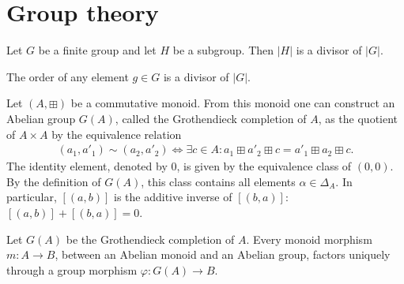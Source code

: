 \section{Group theory}\label{section:groups}



    \begin{theorem}[Lagrange]
        Let $G$ be a finite group and let $H$ be a subgroup. Then $|H|$ is a divisor of $|G|$.
    \end{theorem}
    \begin{result}
        The order of any element $g\in G$ is a divisor of $|G|$.
    \end{result}

    \begin{construct}\label{group:grothendieck_completion}
        Let $(A,\boxplus)$ be a commutative monoid. From this monoid one can construct an Abelian group $G(A)$, called the Grothendieck completion of $A$, as the quotient of $A\times A$ by the equivalence relation
        \begin{gather}
            (a_1,a'_1)\sim (a_2,a'_2) \iff\exists c\in A: a_1 \boxplus a'_2 \boxplus c = a'_1 \boxplus a_2 \boxplus c.
        \end{gather}
        The identity element, denoted by 0, is given by the equivalence class of $(0,0)$. By the definition of $G(A)$, this class contains all elements $\alpha\in\Delta_A$. In particular, $[(a,b)]$ is the additive inverse of $[(b,a)]$: $[(a,b)] + [(b,a)] = 0$.
    \end{construct}
    \begin{uproperty}
        Let $G(A)$ be the Grothendieck completion of $A$. Every monoid morphism $m:A\rightarrow B$, between an Abelian monoid and an Abelian group, factors uniquely through a group morphism $\varphi:G(A)\rightarrow B$.
    \end{uproperty}

